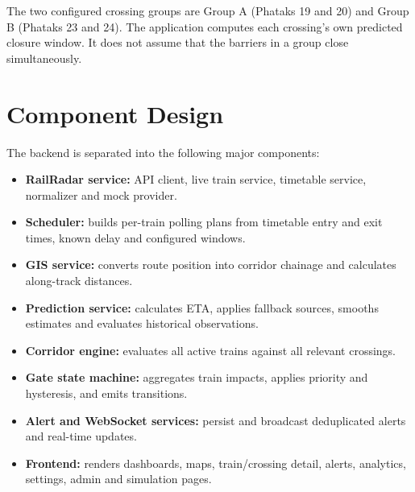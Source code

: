 \documentclass[11pt,a4paper]{report}
\begin{document}
The two configured crossing groups are Group A (Phataks 19 and 20) and Group B (Phataks 23 and 24). The application computes each crossing's own predicted closure window. It does not assume that the barriers in a group close simultaneously.

\section{Component Design}
The backend is separated into the following major components:
\begin{itemize}
  \item \textbf{RailRadar service:} API client, live train service, timetable service, normalizer and mock provider.
  \item \textbf{Scheduler:} builds per-train polling plans from timetable entry and exit times, known delay and configured windows.
  \item \textbf{GIS service:} converts route position into corridor chainage and calculates along-track distances.
  \item \textbf{Prediction service:} calculates ETA, applies fallback sources, smooths estimates and evaluates historical observations.
  \item \textbf{Corridor engine:} evaluates all active trains against all relevant crossings.
  \item \textbf{Gate state machine:} aggregates train impacts, applies priority and hysteresis, and emits transitions.
  \item \textbf{Alert and WebSocket services:} persist and broadcast deduplicated alerts and real-time updates.
  \item \textbf{Frontend:} renders dashboards, maps, train/crossing detail, alerts, analytics, settings, admin and simulation pages.
\end{itemize}
\end{document}
